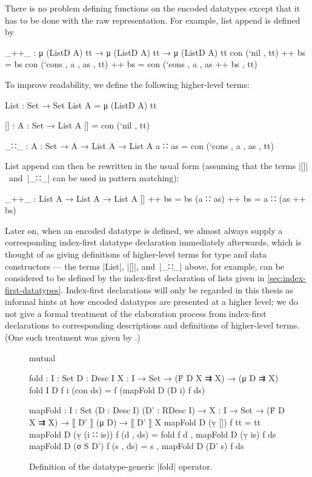 
There is no problem defining functions on the encoded datatypes except that it has to be done with the raw representation.
For example, list append is defined by
\begin{code}
_++_ : μ (ListD A) tt → μ (ListD A) tt → μ (ListD A) tt
con (`nil   ,           tt) ++ bs = bs
con (`cons  , a , as ,  tt) ++ bs = con (`cons , a , as ++ bs , tt)
\end{code}
To improve readability, we define the following higher-level terms:
\begin{code}
List : Set → Set
List A = μ (ListD A) tt

[] : {A : Set} → List A
[] = con (`nil , tt)

_∷_ : {A : Set} → A → List A → List A
a ∷ as = con (`cons  , a , as ,  tt)
\end{code}
List append can then be rewritten in the usual form (assuming that the terms |[]|~and~|_∷_| can be used in pattern matching):
\begin{code}
_++_ : List A → List A → List A
[]        ++ bs = bs
(a ∷ as)  ++ bs = a ∷ (as ++ bs)
\end{code}
Later on, when an encoded datatype is defined, we almost always supply a corresponding index-first datatype declaration immediately afterwards, which is thought of as giving definitions of higher-level terms for type and data constructors --- the terms |List|, |[]|, and~|_∷_| above, for example, can be considered to be defined by the index-first declaration of lists given in \autoref{sec:index-first-datatypes}.
Index-first declarations will only be regarded in this thesis as informal hints at how encoded datatypes are presented at a higher level; we do not give a formal treatment of the elaboration process from index-first declarations to corresponding descriptions and definitions of higher-level terms.
(One such treatment was given by \citet{Dagand-elaboration}.)

\begin{figure}
\codefigure
\begin{code}
mutual

  fold : {I : Set} {D : Desc I} {X : I → Set} → (Ḟ D X ⇉ X) → (μ D ⇉ X)
  fold {I} {D} f {i} (con ds) = f (mapFold D (D i) f ds)

  mapFold :  {I : Set} (D : Desc I) (D' : RDesc I) →
             {X : I → Set} → (Ḟ D X ⇉ X) → ⟦ D' ⟧ (μ D) → ⟦ D' ⟧ X
  mapFold D (ṿ [])        f tt         = tt
  mapFold D (ṿ (i ∷ is))  f (d  , ds)  = fold f d , mapFold D (ṿ is) f ds
  mapFold D (σ S D')      f (s  , ds)  = s , mapFold D (D' s) f ds
\end{code}
\caption{Definition of the datatype-generic |fold| operator.}
\label{fig:fold}
\end{figure}

